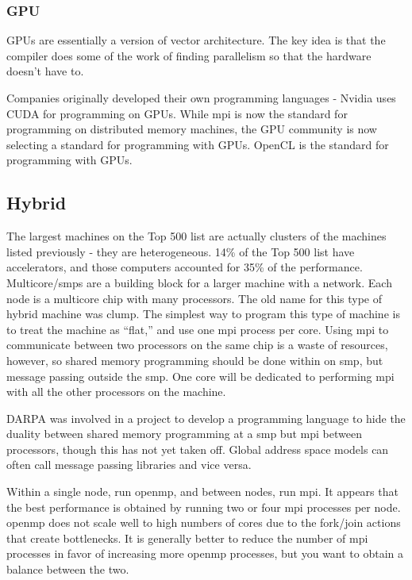 \documentclass[10pt]{article}
\begin{document}
\begin{flushleft}
\subsubsection{GPU}

GPUs are essentially a version of vector architecture. The key idea is that the compiler does some of the work of finding parallelism so that the hardware doesn't have to. 

Companies originally developed their own programming languages - Nvidia uses CUDA for programming on GPUs. While \gls{mpi} is now the standard for programming on distributed memory machines, the GPU community is now selecting a standard for programming with GPUs. OpenCL is the standard for programming with GPUs. 

\subsection{Hybrid}

The largest machines on the Top 500 list are actually clusters of the machines listed previously - they are heterogeneous. 14\% of the Top 500 list have accelerators, and those computers accounted for 35\% of the performance. Multicore/\gls{smp}s are a building block for a larger machine with a network. Each node is a multicore chip with many processors. The old name for this type of hybrid machine was \gls{clump}. The simplest way to program this type of machine is to treat the machine as ``flat,'' and use one \gls{mpi} process per core. Using \gls{mpi} to communicate between two processors on the same chip is a waste of resources, however, so shared memory programming should be done within on \gls{smp}, but message passing outside the \gls{smp}. One core will be dedicated to performing \gls{mpi} with all the other processors on the machine. 

DARPA was involved in a project to develop a programming language to hide the duality between shared memory programming at a \gls{smp} but \gls{mpi} between processors, though this has not yet taken off. Global address space models can often call message passing libraries and vice versa. 

Within a single node, run \gls{openmp}, and between nodes, run \gls{mpi}. It appears that the best performance is obtained by running two or four \gls{mpi} processes per node. \gls{openmp} does not scale well to high numbers of cores due to the fork/join actions that create bottlenecks. It is generally better to reduce the number of \gls{mpi} processes in favor of increasing more \gls{openmp} processes, but you want to obtain a balance between the two.


\end{flushleft}
\end{document}
